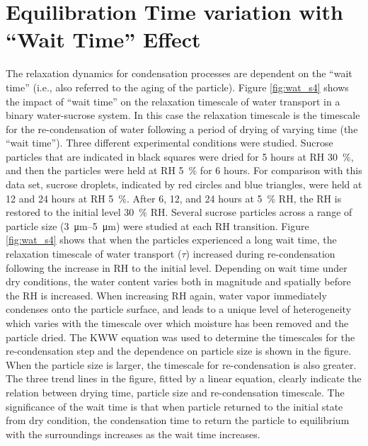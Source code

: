 \section{Equilibration Time variation with ``Wait Time'' Effect}
The relaxation dynamics for condensation processes are dependent on the ``wait time'' (i.e., also referred to the aging of the particle). Figure \ref{fig:wat_s4} shows the impact of ``wait time'' on the relaxation timescale of water transport in a binary water-sucrose system. In this case the relaxation timescale is the timescale for the re-condensation of water following a period of drying of varying time (the ``wait time''). Three different experimental conditions were studied. Sucrose particles that are indicated in black squares were dried for \num{5} hours at RH \SI{30}{\percent}, and then the particles were held at RH \SI{5}{\percent} for \num{6} hours. For comparison with this data set, sucrose droplets, indicated by red circles and blue triangles, were held at \num{12} and \num{24} hours at RH \SI{5}{\percent}. After \num{6}, \num{12}, and \num{24} hours at \SI{5}{\percent} RH, the RH is restored to the initial level \SI{30}{\percent} RH. Several sucrose particles across a range of particle size (\SIrange[range-phrase=--]{3}{5}{\micro\meter}) were studied at each RH transition. Figure \ref{fig:wat_s4} shows that when the particles experienced a long wait time, the relaxation timescale of water transport ($\tau$) increased during re-condensation following the increase in RH to the initial level. Depending on wait time under dry conditions, the water content varies both in magnitude and spatially before the RH is increased.\cite{Rickards2015} When increasing RH again, water vapor immediately condenses onto the particle surface, and leads to a unique level of heterogeneity which varies with the timescale over which moisture has been removed and the particle dried.\cite{Rickards2015}\cite{luTimescalesWaterTransport2014} The KWW equation was used to determine the timescales for the re-condensation step and the dependence on particle size is shown in the figure. When the particle size is larger, the timescale for re-condensation is also greater. The three trend lines in the figure, fitted by a linear equation, clearly indicate the relation between drying time, particle size and re-condensation timescale. The significance of the wait time is that when particle returned to the initial state from dry condition, the condensation time to return the particle to equilibrium with the surroundings increases as the wait time increases. 


